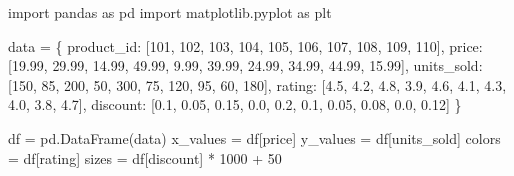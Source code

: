 \documentclass[
  english,
  letterpaper,
  DIV=11,
  numbers=noendperiod]{scrreprt}
\newenvironment{Shaded}{\begin{snugshade}}{\end{snugshade}}
\newcommand{\DecValTok}[1]{\textcolor[rgb]{0.68,0.00,0.00}{#1}}
\newcommand{\FloatTok}[1]{\textcolor[rgb]{0.68,0.00,0.00}{#1}}
\newcommand{\ImportTok}[1]{\textcolor[rgb]{0.00,0.46,0.62}{#1}}
\newcommand{\NormalTok}[1]{\textcolor[rgb]{0.00,0.23,0.31}{#1}}
\newcommand{\OperatorTok}[1]{\textcolor[rgb]{0.37,0.37,0.37}{#1}}
\newcommand{\StringTok}[1]{\textcolor[rgb]{0.13,0.47,0.30}{#1}}
\begin{document}
\begin{Shaded}
\begin{Highlighting}[]
\ImportTok{import}\NormalTok{ pandas }\ImportTok{as}\NormalTok{ pd}
\ImportTok{import}\NormalTok{ matplotlib.pyplot }\ImportTok{as}\NormalTok{ plt}

\NormalTok{data }\OperatorTok{=}\NormalTok{ \{}
    \StringTok{\textquotesingle{}product\_id\textquotesingle{}}\NormalTok{: [}\DecValTok{101}\NormalTok{, }\DecValTok{102}\NormalTok{, }\DecValTok{103}\NormalTok{, }\DecValTok{104}\NormalTok{, }\DecValTok{105}\NormalTok{, }\DecValTok{106}\NormalTok{, }\DecValTok{107}\NormalTok{, }\DecValTok{108}\NormalTok{, }\DecValTok{109}\NormalTok{, }\DecValTok{110}\NormalTok{],}
    \StringTok{\textquotesingle{}price\textquotesingle{}}\NormalTok{: [}\FloatTok{19.99}\NormalTok{, }\FloatTok{29.99}\NormalTok{, }\FloatTok{14.99}\NormalTok{, }\FloatTok{49.99}\NormalTok{, }\FloatTok{9.99}\NormalTok{, }\FloatTok{39.99}\NormalTok{, }\FloatTok{24.99}\NormalTok{, }\FloatTok{34.99}\NormalTok{, }\FloatTok{44.99}\NormalTok{, }\FloatTok{15.99}\NormalTok{],}
    \StringTok{\textquotesingle{}units\_sold\textquotesingle{}}\NormalTok{: [}\DecValTok{150}\NormalTok{, }\DecValTok{85}\NormalTok{, }\DecValTok{200}\NormalTok{, }\DecValTok{50}\NormalTok{, }\DecValTok{300}\NormalTok{, }\DecValTok{75}\NormalTok{, }\DecValTok{120}\NormalTok{, }\DecValTok{95}\NormalTok{, }\DecValTok{60}\NormalTok{, }\DecValTok{180}\NormalTok{],}
    \StringTok{\textquotesingle{}rating\textquotesingle{}}\NormalTok{: [}\FloatTok{4.5}\NormalTok{, }\FloatTok{4.2}\NormalTok{, }\FloatTok{4.8}\NormalTok{, }\FloatTok{3.9}\NormalTok{, }\FloatTok{4.6}\NormalTok{, }\FloatTok{4.1}\NormalTok{, }\FloatTok{4.3}\NormalTok{, }\FloatTok{4.0}\NormalTok{, }\FloatTok{3.8}\NormalTok{, }\FloatTok{4.7}\NormalTok{],}
    \StringTok{\textquotesingle{}discount\textquotesingle{}}\NormalTok{: [}\FloatTok{0.1}\NormalTok{, }\FloatTok{0.05}\NormalTok{, }\FloatTok{0.15}\NormalTok{, }\FloatTok{0.0}\NormalTok{, }\FloatTok{0.2}\NormalTok{, }\FloatTok{0.1}\NormalTok{, }\FloatTok{0.05}\NormalTok{, }\FloatTok{0.08}\NormalTok{, }\FloatTok{0.0}\NormalTok{, }\FloatTok{0.12}\NormalTok{]}
\NormalTok{\}}

\NormalTok{df }\OperatorTok{=}\NormalTok{ pd.DataFrame(data)}
\NormalTok{x\_values }\OperatorTok{=}\NormalTok{ df[}\StringTok{\textquotesingle{}price\textquotesingle{}}\NormalTok{]}
\NormalTok{y\_values }\OperatorTok{=}\NormalTok{ df[}\StringTok{\textquotesingle{}units\_sold\textquotesingle{}}\NormalTok{]}
\NormalTok{colors }\OperatorTok{=}\NormalTok{ df[}\StringTok{\textquotesingle{}rating\textquotesingle{}}\NormalTok{]}
\NormalTok{sizes }\OperatorTok{=}\NormalTok{ df[}\StringTok{\textquotesingle{}discount\textquotesingle{}}\NormalTok{] }\OperatorTok{*} \DecValTok{1000} \OperatorTok{+} \DecValTok{50}


\end{Highlighting}
\end{Shaded}
\end{document}
